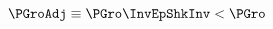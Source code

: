   \begin{equation}\begin{gathered}\begin{aligned}
    \PGroAdj & \equiv \PGro \InvEpShkInv < \PGro \label{eq:PGroAdj}
  \end{aligned}\end{gathered}\end{equation}
